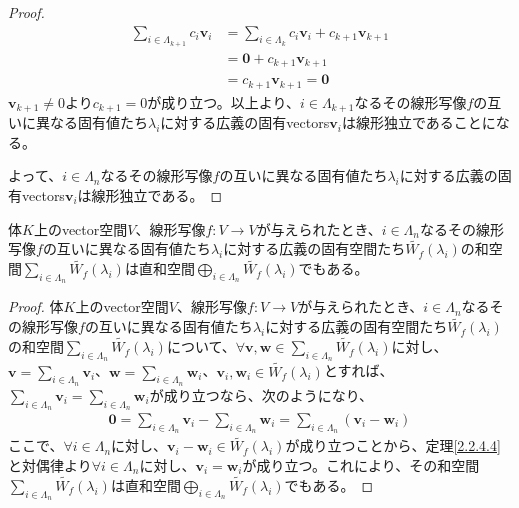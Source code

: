 \documentclass[dvipdfmx]{jsarticle}
\begin{document}
\begin{proof}
\begin{align*}
\sum_{i \in \varLambda_{k + 1}} {c_{i}\mathbf{v}_{i}} &= \sum_{i \in \varLambda_{k}} {c_{i}\mathbf{v}_{i}} + c_{k + 1}\mathbf{v}_{k + 1}\\
&= \mathbf{0} + c_{k + 1}\mathbf{v}_{k + 1}\\
&= c_{k + 1}\mathbf{v}_{k + 1} = \mathbf{0}
\end{align*}
$\mathbf{v}_{k + 1} \neq 0$より$c_{k + 1} = 0$が成り立つ。以上より、$i \in \varLambda_{k + 1}$なるその線形写像$f$の互いに異なる固有値たち$\lambda_{i}$に対する広義の固有vectors$\mathbf{v}_{i}$は線形独立であることになる。\par
よって、$i \in \varLambda_{n}$なるその線形写像$f$の互いに異なる固有値たち$\lambda_{i}$に対する広義の固有vectors$\mathbf{v}_{i}$は線形独立である。
\end{proof}
\begin{thm}
\label{2.2.4.5}
体$K$上のvector空間$V$、線形写像$f:V \rightarrow V$が与えられたとき、$i \in \varLambda_{n}$なるその線形写像$f$の互いに異なる固有値たち$\lambda_{i}$に対する広義の固有空間たち$\widetilde{W_{f}}\left( \lambda_{i} \right)$の和空間$\sum_{i \in \varLambda_{n}} {\widetilde{W_{f}}\left( \lambda_{i} \right)}$は直和空間$\bigoplus_{i \in \varLambda_{n}} {\widetilde{W_{f}}\left( \lambda_{i} \right)}$でもある。
\end{thm}
\begin{proof}
体$K$上のvector空間$V$、線形写像$f:V \rightarrow V$が与えられたとき、$i \in \varLambda_{n}$なるその線形写像$f$の互いに異なる固有値たち$\lambda_{i}$に対する広義の固有空間たち$\widetilde{W_{f}}\left( \lambda_{i} \right)$の和空間$\sum_{i \in \varLambda_{n}} {\widetilde{W_{f}}\left( \lambda_{i} \right)}$について、$\forall\mathbf{v},\mathbf{w} \in \sum_{i \in \varLambda_{n}} {\widetilde{W_{f}}\left( \lambda_{i} \right)}$に対し、$\mathbf{v} = \sum_{i \in \varLambda_{n}} \mathbf{v}_{i}$、$\mathbf{w} = \sum_{i \in \varLambda_{n}} \mathbf{w}_{i}$、$\mathbf{v}_{i},\mathbf{w}_{i} \in \widetilde{W_{f}}\left( \lambda_{i} \right)$とすれば、$\sum_{i \in \varLambda_{n}} \mathbf{v}_{i} = \sum_{i \in \varLambda_{n}} \mathbf{w}_{i}$が成り立つなら、次のようになり、
\begin{align*}
\mathbf{0} = \sum_{i \in \varLambda_{n}} \mathbf{v}_{i} - \sum_{i \in \varLambda_{n}} \mathbf{w}_{i} = \sum_{i \in \varLambda_{n}} \left( \mathbf{v}_{i} - \mathbf{w}_{i} \right)
\end{align*}
ここで、$\forall i \in \varLambda_{n}$に対し、$\mathbf{v}_{i} - \mathbf{w}_{i} \in \widetilde{W_{f}}\left( \lambda_{i} \right)$が成り立つことから、定理\ref{2.2.4.4}と対偶律より$\forall i \in \varLambda_{n}$に対し、$\mathbf{v}_{i} = \mathbf{w}_{i}$が成り立つ。これにより、その和空間$\sum_{i \in \varLambda_{n}} {\widetilde{W_{f}}\left( \lambda_{i} \right)}$は直和空間$\bigoplus_{i \in \varLambda_{n}} {\widetilde{W_{f}}\left( \lambda_{i} \right)}$でもある。
\end{proof}
\end{document}
